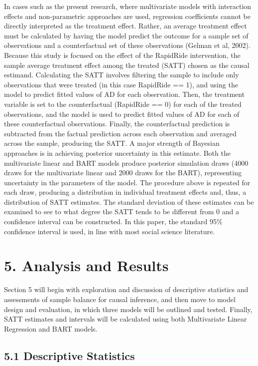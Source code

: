\documentclass[
  12pt,
]{article}
\begin{document}
In cases such as the present research, where multivariate models with
interaction effects and non-parametric approaches are used, regression
coefficients cannot be directly interpreted as the treatment effect.
Rather, an average treatment effect must be calculated by having the
model predict the outcome for a sample set of observations and a
counterfactual set of these observations (Gelman et al, 2002). Because
this study is focused on the effect of the RapidRide intervention, the
sample average treatment effect among the treated (SATT) chosen as the
causal estimand. Calculating the SATT involves filtering the sample to
include only observations that were treated (in this case RapidRide ==
1), and using the model to predict fitted values of AD for each
observation. Then, the treatment variable is set to the counterfactual
(RapidRide == 0) for each of the treated observations, and the model is
used to predict fitted values of AD for each of these counterfactual
observations. Finally, the counterfactual prediction is subtracted from
the factual prediction across each observation and averaged across the
sample, producing the SATT. A major strength of Bayesian approaches is
in achieving posterior uncertainty in this estimate. Both the
multivariate linear and BART models produce posterior simulation draws
(4000 draws for the multivariate linear and 2000 draws for the BART),
representing uncertainty in the parameters of the model. The procedure
above is repeated for each draw, producing a distribution in individual
treatment effects and, thus, a distribution of SATT estimates. The
standard deviation of these estimates can be examined to see to what
degree the SATT tends to be different from 0 and a confidence interval
can be constructed. In this paper, the standard 95\% confidence interval
is used, in line with most social science literature.

\section{5. Analysis and Results}\label{analysis-and-results}

Section 5 will begin with exploration and discussion of descriptive
statistics and assessments of sample balance for causal inference, and
then move to model design and evaluation, in which three models will be
outlined and tested. Finally, SATT estimates and intervals will be
calculated using both Multivariate Linear Regression and BART models.

\subsection{5.1 Descriptive Statistics}\label{descriptive-statistics}
\end{document}
